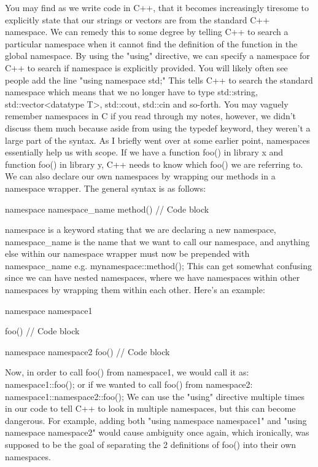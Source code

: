 \documentclass{article}
\begin{document}
You may find as we write code in C++, that it becomes increasingly tiresome to explicitly state that our
strings or vectors are from the standard C++ namespace. We can remedy this to some degree by telling C++ to
search a particular namespace when it cannot find the definition of the function in the global namespace. By
using the "using" directive, we can specify a namespace for C++ to search if namespace is explicitly provided.
You will likely often see people add the line "using namespace std;" This tells C++ to search the standard
namespace which means that we no longer have to type std::string, std::vector<datatype T>, std::cout, std::cin
and so-forth. You may vaguely remember namespaces in C if you read through my notes, however, we didn't discuss
them much because aside from using the typedef keyword, they weren't a large part of the syntax. As I briefly
went over at some earlier point, namespaces essentially help us with scope. If we have a function foo() in
library x and function foo() in library y, C++ needs to know which foo() we are referring to. We can also
declare our own namespaces by wrapping our methods in a namespace wrapper. The general syntax is as follows:

\begin{cpplst}
namespace namespace_name {
	method() {
		// Code block
    }
}
\end{cpplst}

namespace is a keyword stating that we are declaring a new namespace, namespace\_name is the name that we want
to call our namespace, and anything else within our namespace wrapper must now be prepended with
namespace\_name e.g. mynamespace::method(); This can get somewhat confusing since we can have nested
namespaces, where we have namespaces within other namespaces by wrapping them within each other. Here's an
example:

\begin{cpplst}
namespace namespace1 {
	foo() {
		// Code block
    }

	namespace namespace2 {
		foo() {
            // Code block
        }
    }
}
\end{cpplst}

Now, in order to call foo() from namespace1, we would call it as: namespace1::foo(); or if we wanted to call
foo() from namespace2: namespace1::namespace2::foo(); We can use the "using" directive multiple times in our
code to tell C++ to look in multiple namespaces, but this can become dangerous. For example, adding both
"using namespace namespace1" and "using namespace namespace2" would cause ambiguity once again, which
ironically, was supposed to be the goal of separating the 2 definitions of foo() into their own namespaces.
\end{document}
